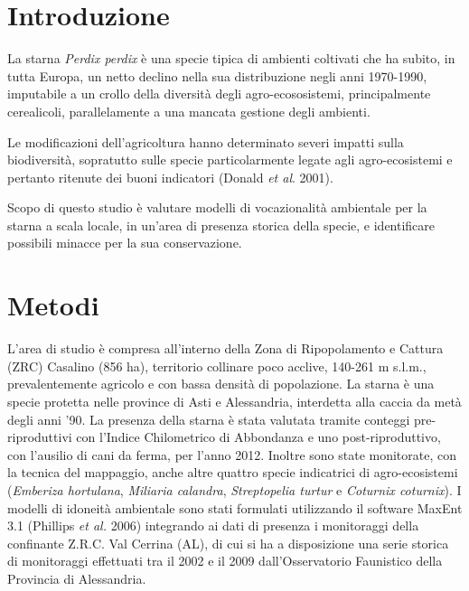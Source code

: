 \section*{Introduzione}

La starna \textit{Perdix perdix} \`e una specie tipica di ambienti
coltivati che ha subito, in tutta Europa, un netto declino nella sua
distribuzione negli anni 1970-1990, imputabile a un crollo della
diversit\`a degli agro-ecososistemi, principalmente cerealicoli,
parallelamente a una mancata gestione degli ambienti.

Le modificazioni
dell{\textquoteright}agricoltura hanno determinato severi impatti sulla
biodiversit\`a, sopratutto sulle specie particolarmente legate agli
agro-ecosistemi e pertanto ritenute dei buoni indicatori (Donald
\textit{\textcolor[rgb]{0.0,0.0,0.039215688}{et
al}}\textcolor[rgb]{0.0,0.0,0.039215688}{. 2001).}

Scopo di questo studio \`e valutare modelli di vocazionalit\`a
ambientale per la starna a scala locale, in un'area di
presenza storica della specie, e identificare possibili minacce per la
sua conservazione. 

\section*{Metodi}
L'area di studio \`e compresa
all'interno della Zona di Ripopolamento e Cattura
(ZRC) {\textquotedbl}Casalino{\textquotedbl} (856 ha), territorio
collinare poco acclive, 140-261 m s.l.m., prevalentemente agricolo e
con bassa densit\`a di popolazione. La starna \`e una specie protetta
nelle province di Asti e Alessandria, interdetta alla caccia da met\`a
degli anni '90. 
{La presenza della starna \`e stata valutata tramite
conteggi pre-riproduttivi con l'Indice Chilometrico di
Abbondanza e uno post-riproduttivo, con l'ausilio di
cani da ferma, per l'anno 2012. Inoltre sono state
monitorate, con la tecnica del mappaggio, anche altre quattro specie
indicatrici di agro-ecosistemi (}\textit{{Emberiza
hortulana}}{, }\textit{{Miliaria
calandra}}{, }\textit{{Streptopelia
turtur }}{e }\textit{{Coturnix
coturnix}}{). I modelli di idoneit\`a ambientale sono
stati formulati utilizzando il software MaxEnt 3.1 (Phillips
}\textit{{et al.}}{ 2006) integrando
ai dati di presenza i monitoraggi della confinante Z.R.C.
{\textquotedbl}Val Cerrina{\textquotedbl} (AL), di cui si} ha a
disposizione una serie storica di monitoraggi effettuati tra il 2002 e
il 2009 dall'Osservatorio Faunistico della Provincia
di Alessandria{. }


